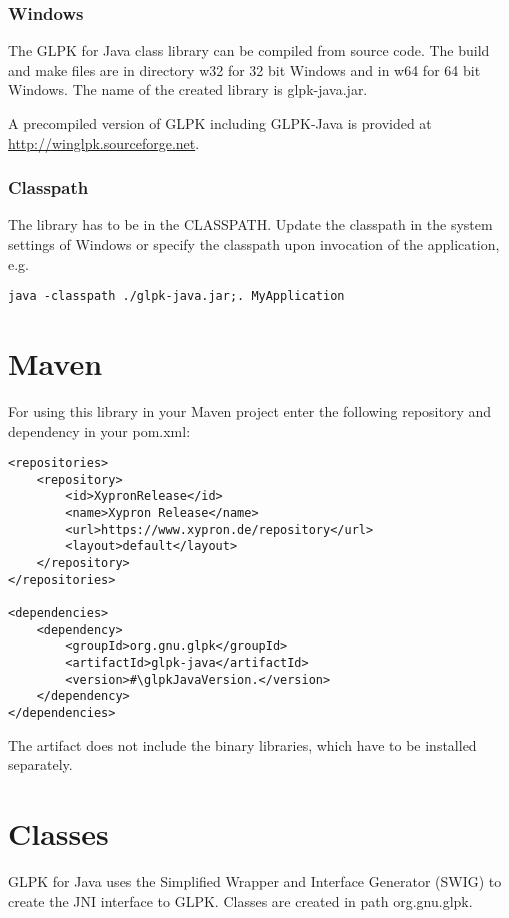 \documentclass[a4paper,11pt]{report}
\newcommand{\glpkJavaVersion}{1.8.0}
\begin{document}
\subsection{Windows}
The GLPK for Java class library can be compiled from source code. The build and make files are in directory w32 for 32 bit Windows and in w64 for 64 bit Windows. The name of the created library is glpk-java.jar.

A precompiled version of GLPK including GLPK-Java is provided at \linebreak\href{http://winglpk.sourceforge.net}{http://winglpk.sourceforge.net}.

\subsection{Classpath}
The library has to be in the CLASSPATH. Update the classpath in the system settings of Windows or specify the classpath upon invocation of the application, e.g.
\begin{verbatim}
java -classpath ./glpk-java.jar;. MyApplication
\end{verbatim}
\chapter{Maven}
For using this library in your Maven project enter the following repository and dependency in your pom.xml:
\begin{lstlisting}
<repositories>
    <repository>
        <id>XypronRelease</id>
        <name>Xypron Release</name>
        <url>https://www.xypron.de/repository</url>
        <layout>default</layout>
    </repository>
</repositories>

<dependencies>
    <dependency>
        <groupId>org.gnu.glpk</groupId>
        <artifactId>glpk-java</artifactId>
        <version>#\glpkJavaVersion.</version>
    </dependency>
</dependencies>
\end{lstlisting}
The artifact does not include the binary libraries, which have to be installed separately.
\chapter{Classes}
GLPK for Java uses the Simplified Wrapper and Interface Generator (SWIG)\cite{SWIG} to create
the JNI interface to GLPK.
Classes are created in path org.gnu.glpk.
\end{document}

